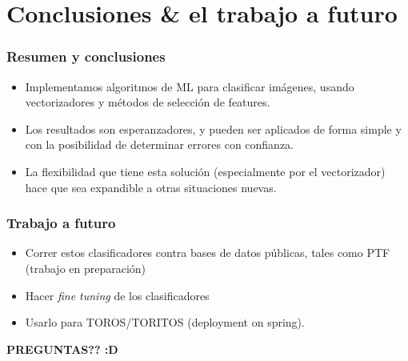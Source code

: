 \documentclass[10pt]{beamer}
\begin{document}
\section{Conclusiones \& el trabajo a futuro}
\frame{
\tableofcontents[ 
    currentsection, 
    sectionstyle=show/hide, 
    sectionstyle=show/shaded, 
    ]}
\begin{frame}%
\frametitle{Resumen y conclusiones}
\begin{itemize}[<+->]
\item Implementamos algoritmos de ML para clasificar im\'agenes, 
usando vectorizadores y m\'etodos de selecci\'on de features.
\item Los resultados son esperanzadores, y pueden ser aplicados de forma simple y con la posibilidad de 
determinar errores con confianza.
\item La flexibilidad que tiene esta soluci\'on (especialmente por el vectorizador) hace
que sea expandible a otras situaciones nuevas.
\end{itemize}
\end{frame}
\begin{frame}
 \frametitle{Trabajo a futuro}
 \begin{itemize}[<+->]
 \item Correr estos clasificadores contra bases de datos p\'ublicas, tales como PTF (trabajo en preparaci\'on)
 \item Hacer \textit{fine tuning} de los clasificadores
  \item Usarlo para TOROS/TORITOS (deployment on spring).
\end{itemize}
\begin{center}
\pause
\textbf{PREGUNTAS?? :D}
\end{center}
\end{frame}
\end{document}
